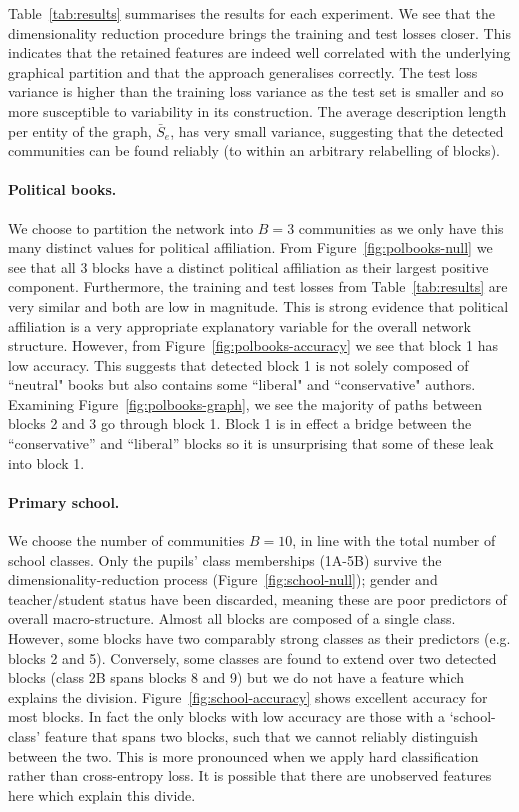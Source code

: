 Table~\ref{tab:results} summarises the results for each experiment. 
We see that the dimensionality reduction procedure 
brings the training and test losses closer. This indicates that
the retained features
are indeed well correlated with the underlying graphical 
partition and that the approach generalises correctly. The test loss variance is higher than the training loss variance as the test set is smaller and so more susceptible to variability in its construction.
%
The average description length per entity of the graph,
$\bar{S}_e$,
has very small variance, suggesting that
the detected communities can be found reliably (to within an arbitrary 
relabelling of blocks).

\paragraph{\textbf{Political books.}}

We choose to partition the network into $B=3$ communities as we only have this many distinct values for political affiliation.
From Figure~\ref{fig:polbooks-null} we see that all 3 blocks have a distinct political affiliation as their largest positive component.  
Furthermore, the training and test losses from Table~\ref{tab:results}  
are very similar and both are low in magnitude. This is strong evidence 
that political affiliation is a very appropriate explanatory 
variable for the overall network structure.
%
However, from Figure~\ref{fig:polbooks-accuracy} we see that block 1 has low accuracy. 
This suggests that detected block 1 is not solely composed of ``neutral" books but also 
contains some ``liberal" and ``conservative" authors. Examining 
Figure~\ref{fig:polbooks-graph}, we see the majority of paths between blocks 2 and 3 go through block 1.
Block 1 is in effect a bridge between the ``conservative'' and ``liberal'' blocks so it is unsurprising that some of these leak into block 1.

\paragraph{\textbf{Primary school.}}

We choose the number of communities $B=10$, in line with the total number of 
school classes. Only the pupils' class memberships (1A-5B) survive
the dimensionality-reduction process (Figure~\ref{fig:school-null});
gender and teacher/student status have been discarded,
meaning these are poor predictors of overall macro-structure.
%
Almost all blocks are composed of a single class. 
However, some blocks have two comparably strong classes as their predictors (e.g. blocks 2 and 5). 
Conversely, some classes are found to extend over two 
detected blocks (class 2B spans blocks 8 and 9) but we do 
not have a feature which explains the division.
%
Figure~\ref{fig:school-accuracy} shows excellent accuracy for most blocks. In fact the only blocks with low accuracy are those with a `school-class'
feature that spans two blocks, such that we cannot reliably distinguish between the two. This is more pronounced when we apply hard classification rather than cross-entropy loss. It is possible that there are unobserved features here
which explain this divide.

